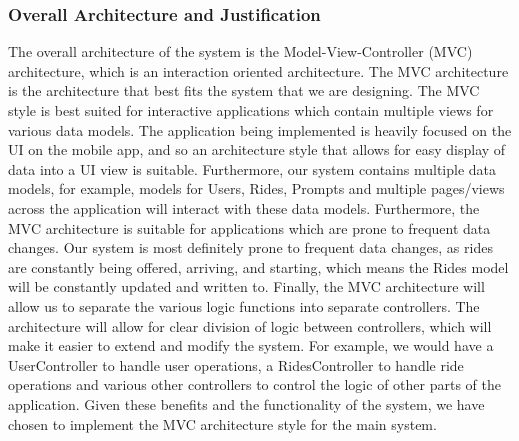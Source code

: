 \documentclass[]{article}
\begin{document}
\subsubsection{Overall Architecture and Justification}
\label{subsub:overall_architecture}
The overall architecture of the system is the Model-View-Controller (MVC) architecture, which is an interaction 
oriented architecture. The MVC architecture is the architecture that best fits the system that we are designing. The MVC style is best suited for 
interactive applications which contain multiple views for various data models. The application being implemented is heavily focused on the UI 
on the mobile app, and so an architecture style that allows for easy display of data into a UI view is suitable. Furthermore, our system contains multiple data models, for example, models for Users, 
Rides, Prompts and multiple pages/views across the application will interact with these data models. Furthermore, the MVC architecture is suitable for 
applications which are prone to frequent data changes. Our system is most definitely prone to frequent data changes, as rides are constantly being offered, 
arriving, and starting, which means the Rides model will be constantly updated and written to. Finally, the MVC architecture will allow us to separate the 
various logic functions into separate controllers. The architecture will allow for clear division of logic between controllers, which will make it easier 
to extend and modify the system. For example, we would have a UserController to handle user operations, a RidesController to handle ride operations and various 
other controllers to control the logic of other parts of the application. Given these benefits and the functionality of the system, we have chosen to implement 
the MVC architecture style for the main system.
\end{document}
